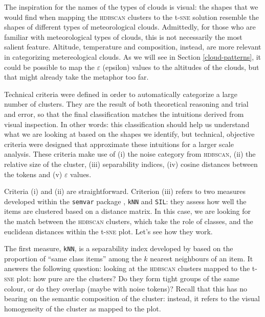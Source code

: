 \documentclass[
]{book}
\begin{document}
The inspiration for the names of the types of clouds is visual: the shapes that we would find when mapping the \textsc{hdbscan} clusters to the t-\textsc{sne} solution resemble the shapes of different types of meteorological clouds. Admittedly, for those who are familiar with meteorological types of clouds, this is not necessarily the most salient feature. Altitude, temperature and composition, instead, are more relevant in categorizing metereological clouds. As we will see in Section \ref{cloud-patterns}, it could be possible to map the \(\varepsilon\) (epsilon) values to the altitudes of the clouds, but that might already take the metaphor too far.

Technical criteria were defined in order to automatically categorize a large number of clusters. They are the result of both theoretical reasoning and trial and error, so that the final classification matches the intuitions derived from visual inspection. In other words: this classification should help us understand what we are looking at based on the shapes we identify, but technical, objective criteria were designed that approximate these intuitions for a larger scale analysis.
These criteria make use of (i) the noise category from \textsc{hdbscan}, (ii) the relative size of the cluster, (iii) separability indices, (iv) cosine distances between the tokens and (v) \(\varepsilon\) values.

Criteria (i) and (ii) are straightforward. Criterion (iii) refers to two measures developed within the \texttt{semvar} package \autocite{R-semvar,speelman.heylen_2017}, \texttt{kNN} and \texttt{SIL}: they assess how well the items are clustered based on a distance matrix. In this case, we are looking for the match between the \textsc{hdbscan} clusters, which take the role of classes, and the euclidean distances within the t-\textsc{sne} plot. Let's see how they work.

The first measure, \texttt{kNN}, is a separability index developed by \textcite{R-semvar} based on the proportion of ``same class items'' among the \(k\) nearest neighbours of an item. It answers the following question: looking at the \textsc{hdbscan} clusters mapped to the t-\textsc{sne} plot: how pure are the clusters? Do they form tight groups of the same colour, or do they overlap (maybe with noise tokens)? Recall that this has no bearing on the semantic composition of the cluster: instead, it refers to the visual homogeneity of the cluster as mapped to the plot.
\end{document}

